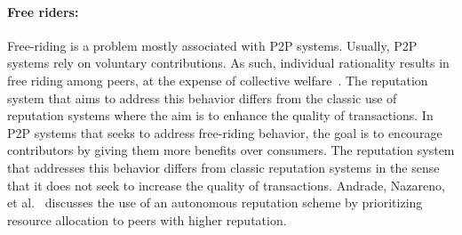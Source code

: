 \paragraph{Free riders:} Free-riding is a problem mostly associated with P2P
systems. Usually, P2P systems rely on voluntary contributions. As such,
individual rationality results in free riding among peers, at the expense of
collective welfare~\cite{feldman2006free}. The reputation system that aims to
address this behavior differs from the classic use of reputation systems where
the aim is to enhance the quality of transactions. In P2P systems that seeks to
address free-riding behavior, the goal is to encourage contributors by giving
them more benefits over consumers. The reputation system that addresses this
behavior differs from classic reputation systems in the sense that it does not
seek to increase the quality of transactions. Andrade, Nazareno, et
al.~\cite{andrade2004can} discusses the use of an autonomous reputation scheme
by prioritizing resource allocation to peers with higher reputation. 



